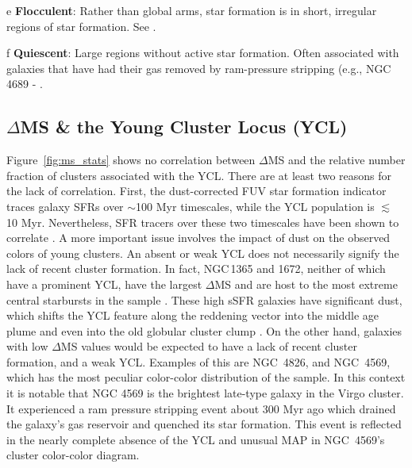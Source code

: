 \documentclass[linenumbers]{aastex63}
\begin{document}
\begin{table*}
\begin{center}
\begin{threeparttable}
\begin{tablenotes}
\item[e] \textbf{Flocculent}: Rather than global arms, star formation is in short, irregular regions of star formation. See \citet{EE87}.
\item[f] \textbf{Quiescent}: Large regions without active star formation. Often associated with galaxies that have had their gas removed by ram-pressure stripping (e.g., NGC 4689 - \citep{kenney_co_1986}.
\end{tablenotes}
\end{threeparttable}
\end{center}
\end{table*}

% 




\subsection{$\Delta$MS \& the Young Cluster Locus (YCL)}\label{sec:ycl}
Figure~\ref{fig:ms_stats} shows no correlation between $\Delta$MS and the relative number fraction of clusters associated with the YCL. There are at least two reasons for the lack of correlation.  First, the dust-corrected FUV star formation indicator traces galaxy SFRs over $\sim$100 Myr timescales, while the YCL population is $\lesssim$ 10 Myr.  Nevertheless, SFR tracers over these two timescales have been shown to correlate \citep[e.g.,][and references therein]{salim_uv_2007, lee_comparison_2009}.  A more important issue involves the impact of dust on the observed colors of young clusters.   An absent or weak YCL does not necessarily signify the lack of recent cluster formation.  In fact, NGC\,1365 and 1672, neither of which have a prominent YCL, have the largest $\Delta$MS and are host to the most extreme central starbursts in the sample \citep{brandt_rosat_1996, querejeta_stellar_2021, whitmore_phangs-jwst_2023}.  These high sSFR galaxies have significant dust, which shifts the YCL feature along the reddening vector into the middle age plume \citep{thilker23sed} and even into the old globular cluster clump \citep{hollyhead_studying_2015}. On the other hand, galaxies with low $\Delta$MS values would be expected to have a lack of recent cluster formation, and a weak YCL.  Examples of this are NGC~4826, and NGC~4569, which has the most peculiar color-color distribution of the sample.  In this context it is notable that NGC 4569 is the brightest late-type galaxy in the Virgo cluster.  It experienced a ram pressure stripping event about 300 Myr ago \citep{vollmer_ngc_2004,crowl_stellar_2008,boselli_spectacular_2016} which drained the galaxy's gas reservoir and quenched its star formation.  This event is reflected in the nearly complete absence of the YCL and unusual MAP in NGC~4569's cluster color-color diagram.
\end{document}
